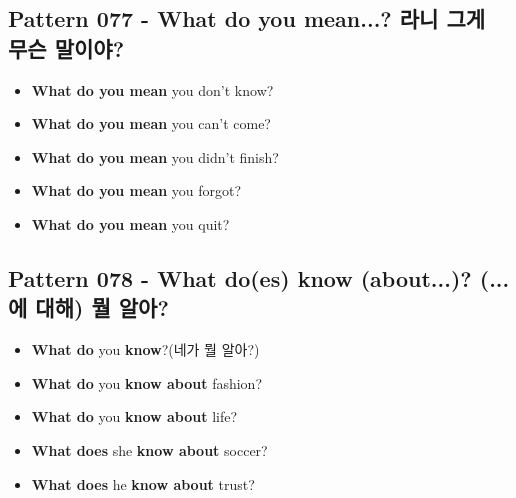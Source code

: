 \documentclass[11pt]{oblivoir}
\begin{document}
\subsection{Pattern 077 - What do you mean...? \texttildelow 라니 그게 무슨 말이야?}
\begin{itemize}
  \item \textbf{What do you mean} you don't know?
  \item \textbf{What do you mean} you can't come?
  \item \textbf{What do you mean} you didn't finish?
  \item \textbf{What do you mean} you forgot?
  \item \textbf{What do you mean} you quit?
\end{itemize}

\subsection{Pattern 078 - What do(es) \texttildelow know (about...)?  (...에 대해) 뭘 알아?}
\begin{itemize}
  \item \textbf{What do} you \textbf{know}?(네가 뭘 알아?)
  \item \textbf{What do} you \textbf{know about} fashion?
  \item \textbf{What do} you \textbf{know about} life?
  \item \textbf{What does} she \textbf{know about} soccer?
  \item \textbf{What does} he \textbf{know about} trust? 
\end{itemize}
\end{document}

